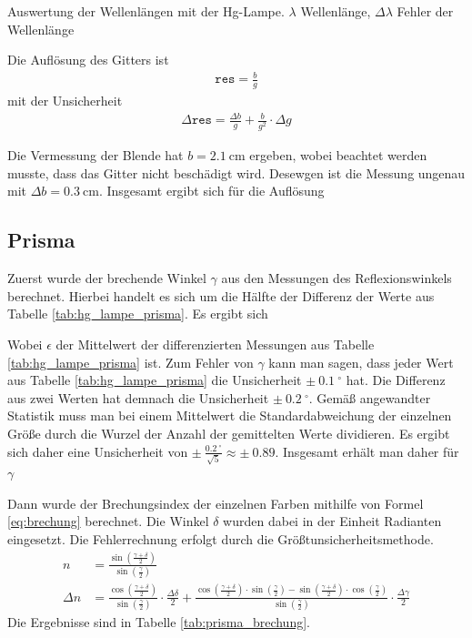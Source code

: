 \documentclass{article}
\begin{document}
\begin{table}[H]
\caption{Auswertung der Wellenlängen mit der Hg-Lampe. $\lambda$ Wellenlänge, $\Delta\lambda$ Fehler der Wellenlänge}
\label{tab:hg_lampe_auswertung}
\centering

\end{table}


Die Auflösung des Gitters ist
\begin{align*}
\texttt{res} = \frac{b}{g} 
\end{align*}
mit der Unsicherheit
\begin{align*}
\Delta\texttt{res} = \frac{\Delta b}{g} + \frac{b}{g^2}\cdot\Delta g
\end{align*}

Die Vermessung der Blende hat $b=2.1~$cm ergeben, wobei beachtet werden musste, dass das Gitter nicht beschädigt wird. Desewgen ist die Messung ungenau mit $\Delta b = 0.3~$cm.
Insgesamt ergibt sich für die Auflösung



\subsection{Prisma}

Zuerst wurde der brechende Winkel $\gamma$ aus den Messungen des Reflexionswinkels berechnet. Hierbei handelt es sich um die Hälfte der Differenz der Werte aus Tabelle \ref{tab:hg_lampe_prisma}. Es ergibt sich 

Wobei $\epsilon$ der Mittelwert der differenzierten Messungen aus Tabelle \ref{tab:hg_lampe_prisma} ist. Zum Fehler von $\gamma$ kann man sagen, dass jeder Wert aus Tabelle \ref{tab:hg_lampe_prisma} die Unsicherheit $\pm~0.1~^\circ$ hat. Die Differenz aus zwei Werten hat demnach die Unsicherheit $\pm~0.2~^\circ$. Gemäß angewandter Statistik muss man bei einem Mittelwert die Standardabweichung der einzelnen Größe durch die Wurzel der Anzahl der gemittelten Werte dividieren. Es ergibt sich daher eine Unsicherheit von $\pm~\frac{0.2~^\circ}{\sqrt{5}} \approx \pm~0.89$. Insgesamt erhält man daher für $\gamma$







Dann wurde der Brechungsindex der einzelnen Farben mithilfe von Formel \eqref{eq:brechung} berechnet. Die Winkel $\delta$ wurden dabei in der Einheit Radianten eingesetzt. Die Fehlerrechnung erfolgt durch die Größtunsicherheitsmethode.
\begin{align*}
n &= \frac{\sin\left(\frac{\gamma + \delta}{2}\right)}{\sin\left(\frac{\gamma}{2}\right)} \\
\Delta n &= \frac{\cos\left(\frac{\gamma + \delta}{2}\right)}{\sin\left(\frac{\gamma}{2}\right)}\cdot \frac{\Delta \delta}{2} + \frac{\cos\left(\frac{\gamma + \delta}{2}\right)\cdot \sin\left(\frac{\gamma}{2}\right) - \sin\left(\frac{\gamma + \delta}{2}\right)\cdot \cos\left(\frac{\gamma}{2}\right)}{\sin\left(\frac{\gamma}{2}\right)} \cdot\frac{\Delta \gamma}{2}
\end{align*}
Die Ergebnisse sind in Tabelle \ref{tab:prisma_brechung}.
\end{document}
